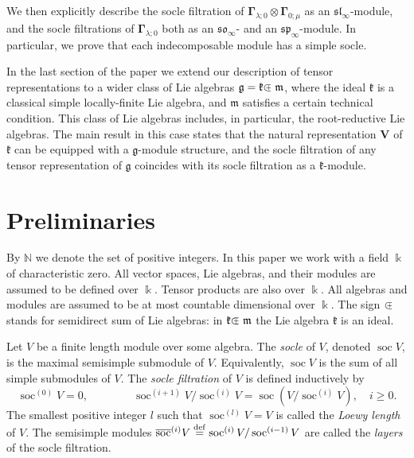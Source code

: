 \documentclass[12pt,reqno]{amsart}
\numberwithin{equation}{section}
\theoremstyle{plain}
\newtheorem*{conj}{Conjecture}
\theoremstyle{definition}
\def\N{\mathbb N}
\def\gl{\mathfrak{gl}}
\def\sl{\mathfrak{sl}}
\def\so{\mathfrak{so}}
\def\sp{\mathfrak{sp}}
\def\soc{\operatorname{soc}}
\def\o{\otimes}
\def\g{\mathfrak g}
\def\glV_#1{\boldsymbol\Gamma_{#1}}
\def\VV{\mathbf V}
\def\cplus{\hbox{$\subset${\raise0.3ex\hbox{\kern -0.55em ${\scriptscriptstyle +}$}}\ }}
\begin{document}
We then explicitly describe the socle filtration of
$\glV_{\lambda;0} \o \glV_{0;\mu}$ as an $\sl_\infty$-module, and
the socle filtrations of $\glV_{\lambda;0}$ both as an
$\so_{\infty}$- and an $\sp_\infty$-module. In particular, we prove
that each indecomposable module has a simple socle.

In the last section of the paper we extend our description of tensor representations to a wider class of Lie algebras $\g = \mathfrak k \cplus \mathfrak m$, where the ideal $\mathfrak k$ is a classical simple locally-finite Lie algebra, and $\mathfrak m$ satisfies a certain technical condition. This class of Lie algebras includes, in particular, the root-reductive Lie algebras. The main result in this case states that the natural representation $\VV$ of $\mathfrak k$ can be equipped with a $\g$-module structure, and the socle filtration of any tensor representation of $\g$ coincides with its socle filtration as a $\mathfrak k$-module.




\section{Preliminaries}

By $\N$ we denote the set of positive integers.
In this paper we work with a field $\Bbbk$ of characteristic zero.
All vector spaces, Lie algebras, and their modules are assumed to be defined over
$\Bbbk$. Tensor products are also over $\Bbbk$. All algebras and
modules are assumed to be at most countable dimensional over
$\Bbbk$. The sign $\cplus$ stands for semidirect sum of Lie algebras: in
$\mathfrak k \cplus \mathfrak m$ the Lie algebra $\mathfrak k$ is an ideal.


\medskip

Let $V$ be a finite length module over some algebra. The {\it socle}
of $V$, denoted $\soc V$, is the maximal semisimple submodule of $V$. Equivalently, $\soc V$ is the sum of all simple submodules of
$V$. The {\it socle filtration} of $V$ is defined inductively by
\begin{equation*}%
    \soc^{(0)} V = 0,    \qquad\qquad
    \soc^{(i+1)} V/\soc^{(i)} V = \soc(V/\soc^{(i)} V), \quad i\ge 0.
\end{equation*}
The smallest positive integer $l$ such that $\soc^{(l)} V = V$ is
called the {\it Loewy length} of $V$. The semisimple modules
$\overline{\soc}^{(i)} V \overset{\rm def}{=} \soc^{(i)}
V/\soc^{(i-1)} V$ are called the {\it layers} of the socle
filtration.
\end{document}
